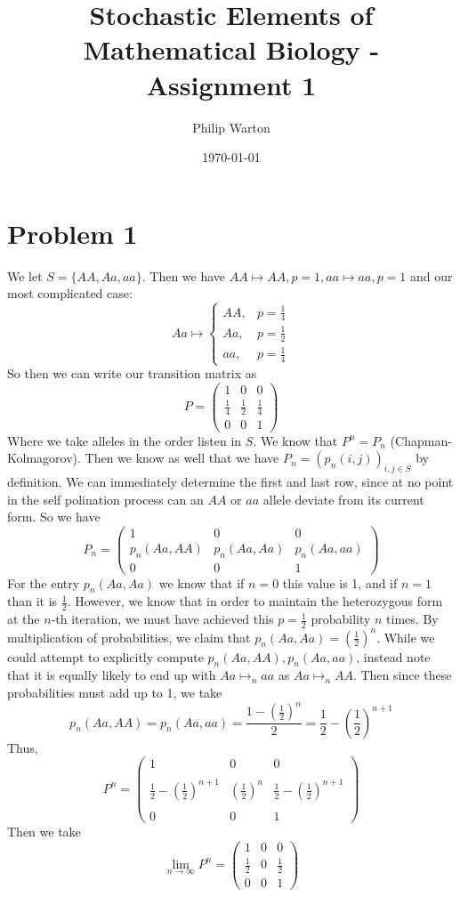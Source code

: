 \documentclass{article}
\theoremstyle{definition}
\begin{document}
\title{Stochastic Elements of Mathematical Biology - Assignment 1}
\author{Philip Warton}
\date{\today}
\maketitle
\section*{Problem 1}
We let $S = \{AA, Aa, aa\}$. Then we have $AA \mapsto AA, p = 1, 
aa \mapsto aa, p = 1$ and our most complicated case:
\[
    Aa \mapsto \begin{cases}
        AA, &p = \frac{1}{4}\\
        Aa, &p = \frac{1}{2}\\
        aa, &p = \frac{1}{4}
    \end{cases}
\]
So then we can write our transition matrix as
\[
    P = \begin{pmatrix}
        1 & 0 & 0\\
        \frac{1}{4} & \frac{1}{2} & \frac{1}{4}\\
        0&0&1
    \end{pmatrix}
\]
Where we take alleles in the order listen in $S$.
We know that $P^n = P_n$ (Chapman-Kolmagorov). Then we know as well that we have 
$P_n = \left(p_n(i,j)\right)_{i,j\in S}$ by definition. We can immediately determine the first and last row,
since at no point in the self polination process can an $AA$ or $aa$ allele deviate from its current form. So we have
\[
    P_n = \begin{pmatrix}
        1&0&0\\
        p_n(Aa,AA)&p_n(Aa,Aa)&p_n(Aa,aa)\\
        0&0&1
    \end{pmatrix}
\]
For the entry $p_n(Aa,Aa)$ we know that if $n = 0$ this value is 1, and if $n = 1$ than it is $\frac{1}{2}$.
However, we know that in order to maintain the heterozygous form at the $n$-th iteration, we must have
achieved this $p = \frac{1}{2}$ probability $n$ times. By multiplication of probabilities, we claim that $p_n(Aa,Aa) = \left(\frac{1}{2}\right)^n$.
While we could attempt to explicitly compute $p_n(Aa,AA), p_n(Aa,aa)$, instead note that it is equally likely to 
end up with $Aa \mapsto_n aa$ as $Aa \mapsto_n AA$. Then since these probabilities must add up to 1,
we take
\[
    p_n(Aa,AA) = p_n(Aa,aa) = \frac{1 - \left(\frac{1}{2}\right)^n}{2} = \frac{1}{2} - \left(\frac{1}{2}\right)^{n+1}
\]
Thus,
\[
    P^n = \begin{pmatrix}
        1&0&0\\\\
        \frac{1}{2} - \left(\frac{1}{2}\right)^{n+1} & \left(\frac{1}{2}\right)^n & \frac{1}{2} - \left(\frac{1}{2}\right)^{n+1}\\\\
        0&0&1
    \end{pmatrix}
\]
Then we take 
\[
    \lim_{n \rightarrow \infty} P^n = \begin{pmatrix}
        1 & 0 & 0\\
        \frac{1}{2} & 0 & \frac{1}{2}\\
        0 & 0 & 1
    \end{pmatrix}
\]
\end{document}
